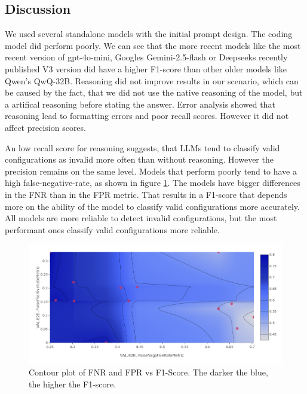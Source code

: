 \subsection{Discussion} \label{sec:exp_discussion}

We used several standalone models with the initial prompt design. The coding model did perform poorly. We can see that the more recent models like the most recent version of gpt-4o-mini, Googles Gemini-2.5-flash or Deepseeks recently published V3 version did have a higher F1-score than other older models like Qwen's QwQ-32B. Reasoning did not improve results in our scenario, which can be caused by the fact, that we did not use the native reasoning of the model, but a artifical reasoning before stating the answer. Error analysis showed that reasoning lead to formatting errors and poor recall scores. However it did not affect precision scores. 

An low recall score for reasoning suggests, that LLMs tend to classify valid configurations as invalid more often than without reasoning. However the precision remains on the same level. Models that perform poorly tend to have a high false-negative-rate, as shown in figure \ref{fig:fnrfpr}. The models have bigger differences in the FNR than in the FPR metric. That results in a F1-score that depends more on the ability of the model to classify valid configurations more accurately. All models are more reliable to detect invalid configurations, but the most performant ones classify valid configurations more reliable.

\begin{figure}[!ht]
    \centering
    \includegraphics[width=\textwidth]{images/FNR-FPR-F1.png}
    \caption{Contour plot of FNR and FPR vs F1-Score. The darker the blue, the higher the F1-score.}
    \label{fig:fnrfpr}
\end{figure}


